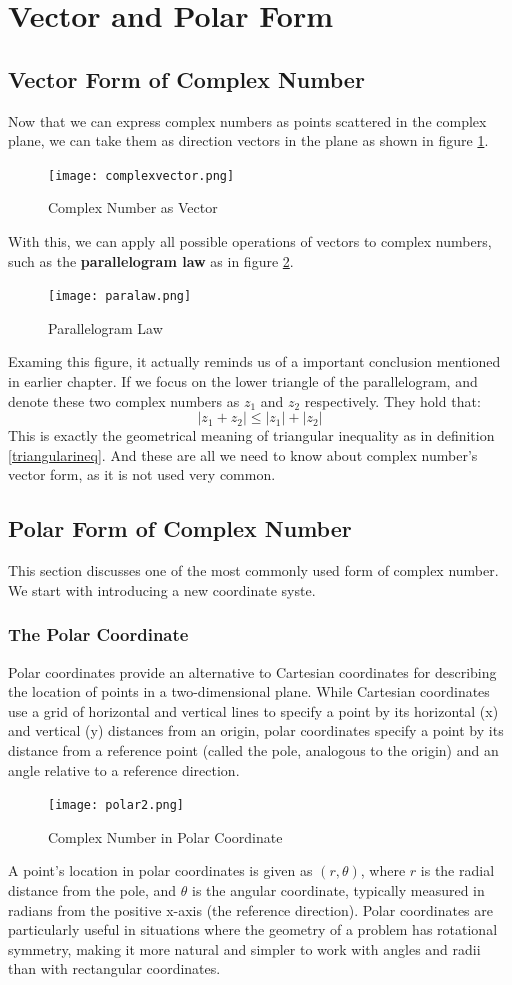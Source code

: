 \documentclass[
	12pt, %
	fleqn, %
	a4paper, %
]{LegrandOrangeBook}
\begin{document}
\section{Vector and Polar Form}
\subsection{Vector Form of Complex Number}
Now that we can express complex numbers as points scattered in the complex plane, we can take them as direction vectors
in the plane as shown in figure \ref{vec}. 
\begin{figure}[H]
    \centering \label{vec}
    \texttt{[image: complexvector.png]}
    \caption{Complex Number as Vector}
\end{figure}
With this, we can apply all possible operations of vectors to complex numbers, such as the \textbf{parallelogram law} as in figure \ref{parrl}.
\begin{figure}[H]
    \centering \label{parrl}
    \texttt{[image: paralaw.png]}
    \caption{Parallelogram Law}
\end{figure}
Examing this figure, it actually reminds us of a important conclusion mentioned in earlier chapter. If we focus on
the lower triangle of the parallelogram, and denote these two complex numbers as $z_1$ and $z_2$ respectively.
They hold that: $$|z_1+z_2| \leq |z_1|+|z_2|$$
This is exactly the geometrical meaning of triangular inequality as in definition \ref{triangularineq}.
And these are all we need to know about complex number's vector form, as it is not used very common.

\subsection{Polar Form of Complex Number}
This section discusses one of the most commonly used form of complex number. We start with introducing a new coordinate syste.

\subsubsection{The Polar Coordinate}
Polar coordinates provide an alternative to Cartesian coordinates for describing the location of points in a two-dimensional plane. While Cartesian coordinates use a grid of horizontal and vertical lines to specify a point by its horizontal (x) and vertical (y) distances from an origin, polar coordinates specify a point by its distance from a reference point (called the pole, analogous to the origin) and an angle relative to a reference direction.
\begin{figure}[H]
    \centering \label{polar}
    \texttt{[image: polar2.png]}
    \caption{Complex Number in Polar Coordinate}
\end{figure}
A point's location in polar coordinates is given as \( (r, \theta) \), where \( r \) is the radial distance from the pole, and \( \theta \) is the angular coordinate, typically measured in radians from the positive x-axis (the reference direction). Polar coordinates are particularly useful in situations where the geometry of a problem has rotational symmetry, making it more natural and simpler to work with angles and radii than with rectangular coordinates.
\end{document}
